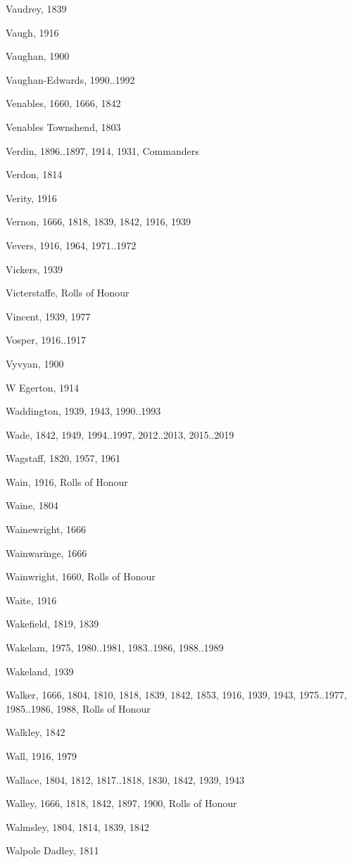 \begin{theindex}
\item Vaudrey, 1839
\item Vaugh, 1916
\item Vaughan, 1900
\item Vaughan-Edwards, 1990..1992
\item Venables, 1660, 1666, 1842
\item Venables Townshend, 1803
\item Verdin, 1896..1897, 1914, 1931, Commanders
\item Verdon, 1814
\item Verity, 1916
\item Vernon, 1666, 1818, 1839, 1842, 1916, 1939
\item Vevers, 1916, 1964, 1971..1972
\item Vickers, 1939
\item Victerstaffe, Rolls of Honour
\item Vincent, 1939, 1977
\item Vosper, 1916..1917
\item Vyvyan, 1900
\item W Egerton, 1914
\item Waddington, 1939, 1943, 1990..1993
\item Wade, 1842, 1949, 1994..1997, 2012..2013, 2015..2019
\item Wagstaff, 1820, 1957, 1961
\item Wain, 1916, Rolls of Honour
\item Waine, 1804
\item Wainewright, 1666
\item Wainwaringe, 1666
\item Wainwright, 1660, Rolls of Honour
\item Waite, 1916
\item Wakefield, 1819, 1839
\item Wakelam, 1975, 1980..1981, 1983..1986, 1988..1989
\item Wakeland, 1939
\item Walker, 1666, 1804, 1810, 1818, 1839, 1842, 1853, 1916, 1939, 1943, 1975..1977, 1985..1986, 1988, Rolls of Honour
\item Walkley, 1842
\item Wall, 1916, 1979
\item Wallace, 1804, 1812, 1817..1818, 1830, 1842, 1939, 1943
\item Walley, 1666, 1818, 1842, 1897, 1900, Rolls of Honour
\item Walmsley, 1804, 1814, 1839, 1842
\item Walpole Dadley, 1811

\end{theindex}
